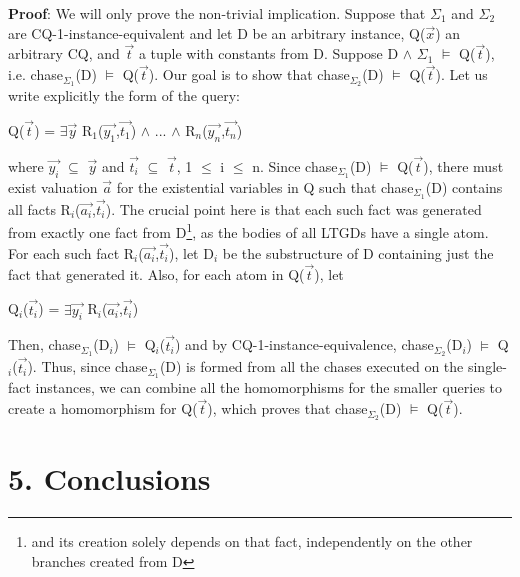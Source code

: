 \documentclass[11pt, a4paper, dvipsnames]{article}
\begin{document}
\textbf{Proof}: We will only prove the non-trivial implication. Suppose that $\Sigma_{1}$ and $\Sigma_{2}$ are CQ-1-instance-equivalent and let D be an arbitrary instance, Q($\vec{x}$) an arbitrary CQ, and $\vec{t}$ a tuple with constants from D. Suppose D $\wedge$ $\Sigma_{1}$ $\vDash$ Q($\vec{t}$), i.e. chase$_{\Sigma_{1}}$(D) $\vDash$ Q($\vec{t}$). Our goal is to show that chase$_{\Sigma_{2}}$(D) $\vDash$ Q($\vec{t}$). Let us write explicitly the form of the query:
\begin{center}
Q($\vec{t}$) = $\exists \vec{y}$ R$_{1}$($\vec{y_{1}}$,$\vec{t_{1}}$) $\wedge$ ... $\wedge$ R$_{n}$($\vec{y_{n}}$,$\vec{t_{n}}$)
\end{center}
where $\vec{y_{i}}$ $\subseteq$ $\vec{y}$ and $\vec{t_{i}}$ $\subseteq$ $\vec{t}$, 1 $\leq$ i $\leq$ n. Since chase$_{\Sigma_{1}}$(D) $\vDash$ Q($\vec{t}$), there must exist valuation $\vec{a}$ for the existential variables in Q such that chase$_{\Sigma_{1}}$(D) contains all facts R$_{i}$($\vec{a_{i}}$,$\vec{t_{i}}$). The crucial point here is that each such fact was generated from exactly one fact from D\footnote{and its creation solely depends on that fact, independently on the other branches created from D}, as the bodies of all LTGDs have a single atom. For each such fact R$_{i}$($\vec{a_{i}}$,$\vec{t_{i}}$), let D$_{i}$ be the substructure of D containing just the fact that generated it. Also, for each atom in Q($\vec{t}$), let 
\begin{center}
Q$_{i}$($\vec{t_{i}}$) = $\exists \vec{y_{i}}$ R$_{i}$($\vec{a_{i}}$,$\vec{t_{i}}$)
\end{center}
Then, chase$_{\Sigma_{1}}$(D$_{i}$) $\vDash$ Q$_{i}$($\vec{t_{i}}$) and by CQ-1-instance-equivalence, chase$_{\Sigma_{2}}$(D$_{i}$) $\vDash$ Q$_{i}$($\vec{t_{i}}$). Thus, since chase$_{\Sigma_{1}}$(D) is formed from all the chases executed on the single-fact instances, we can combine all the homomorphisms for the smaller queries to create a homomorphism for Q($\vec{t}$), which proves that chase$_{\Sigma_{2}}$(D) $\vDash$ Q($\vec{t}$).

\newpage

\section{5. Conclusions}

\newpage
\end{document}
